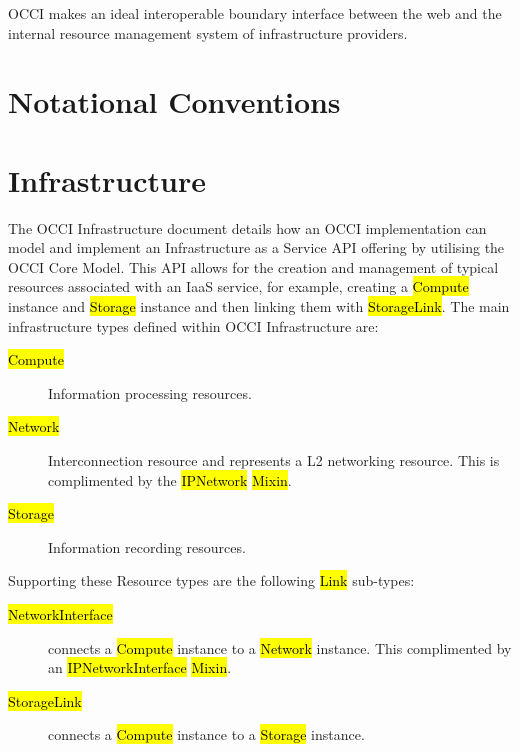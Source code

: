 \documentclass[10pt,a4paper]{article}
\begin{document}
OCCI makes an ideal interoperable boundary interface between the web
and the internal resource management system of infrastructure
providers.

\section{Notational Conventions}



\section{Infrastructure}
The OCCI Infrastructure document details how an OCCI implementation
can model and implement an Infrastructure as a Service API offering by
utilising the OCCI Core Model. This API allows for the creation and
management of typical resources associated with an IaaS service, for
example, creating a \hl{Compute} instance and \hl{Storage} instance
and then linking them with \hl{StorageLink}. The main infrastructure
types defined within OCCI Infrastructure are:

\begin{description}
\item[\hl{Compute}] Information processing resources.
\item[\hl{Network}] Interconnection resource and represents a L2
  networking resource. This is complimented by the \hl{IPNetwork}
  \hl{Mixin}.
\item[\hl{Storage}] Information recording resources.
\end{description}

Supporting these Resource types are the following \hl{Link} sub-types:

\begin{description}
\item[\hl{NetworkInterface}] connects a \hl{Compute} instance to a
  \hl{Network} instance. This complimented by an
  \hl{IPNetworkInterface} \hl{Mixin}.
\item[\hl{StorageLink}] connects a \hl{Compute} instance to a
  \hl{Storage} instance.
\end{description}
\end{document}

